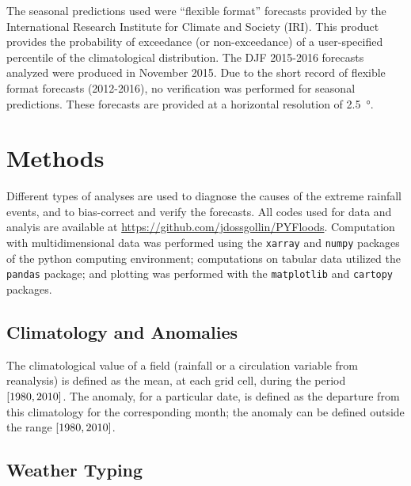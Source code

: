 \documentclass[twocol]{ametsoc}
\begin{document}
The seasonal predictions used were ``flexible format'' forecasts provided by the International Research Institute for Climate and Society (IRI).
This product provides the probability of exceedance (or non-exceedance) of a user-specified percentile of the climatological distribution.
The DJF 2015-2016 forecasts analyzed were produced in November 2015.
Due to the short record of flexible format forecasts (2012-2016), no verification was performed for seasonal predictions.
These forecasts are provided at a horizontal resolution of \SI{2.5}{\degree}.



\section{Methods} \label{sec:methods}

Different types of analyses are used to diagnose the causes of the extreme rainfall events, and to bias-correct and verify the forecasts.
All codes used for data and analyis are available at \url{https://github.com/jdossgollin/PYFloods}.
Computation with multidimensional data was performed using the \texttt{xarray} \citep{hoyer2017xarray} and \texttt{numpy} \citep{vanderWalt:2011dp} packages of the python computing environment; computations on tabular data utilized the \texttt{pandas} \citep{McKinney:2010un} package; and plotting was performed with the \texttt{matplotlib} \citep{Hunter:2007ux} and \texttt{cartopy} \citep{Cartopy} packages.

\subsection{Climatology and Anomalies} \label{sec:climatology-anomalies}

The climatological value of a field (rainfall or a circulation variable from reanalysis) is defined as the mean, at each grid cell, during the period $\qty[1980, 2010]$.
The anomaly, for a particular date, is defined as the departure from this climatology for the corresponding month; the anomaly can be defined outside the range $\qty[1980, 2010]$.

\subsection{Weather Typing}
\end{document}
